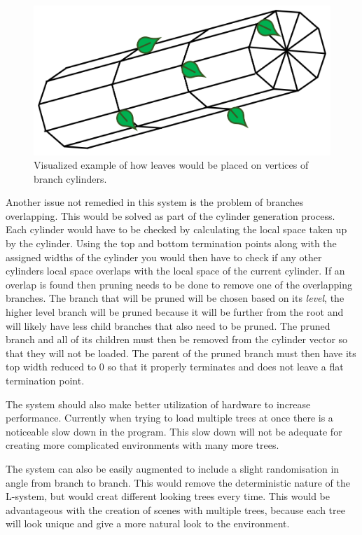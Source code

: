 \documentclass[final]{cmpreport}
\begin{document}
\begin{figure}[ht]
    \includegraphics[scale=0.4]{leaf-placement.PNG} 
    \centering
    \captionsetup{justification=centering}
    \caption{Visualized example of how leaves would be placed on vertices of branch cylinders.}
    \label{fig:leaf-placement}
\end{figure}

Another issue not remedied in this system is the problem of branches overlapping. This would be solved 
as part of the cylinder generation process. Each cylinder would have to be checked by calculating 
the local space taken up by the cylinder. Using the top and bottom termination points along with the 
assigned widths of the cylinder you would then have to check if any other cylinders local space 
overlaps with the local space of the current cylinder. If an overlap is found then pruning needs to 
be done to remove one of the overlapping branches. The branch that will be pruned will be chosen 
based on its \emph{level}, the higher level branch will be pruned because it will be further from 
the root and will likely have less child branches that also need to be pruned. The pruned branch 
and all of its children must then be removed from the cylinder vector so that they will not be 
loaded. The parent of the pruned branch must then have its top width reduced to 0 so that it 
properly terminates and does not leave a flat termination point.

The system should also make better utilization of hardware to increase performance. Currently when 
trying to load multiple trees at once there is a noticeable slow down in the program. This slow down 
will not be adequate for creating more complicated environments with many more trees.

The system can also be easily augmented to include a slight randomisation in angle from branch to branch.
This would remove the deterministic nature of the L-system, but would creat different looking trees 
every time. This would be advantageous with the creation of scenes with multiple trees, because each tree will 
look unique and give a more natural look to the environment.
\end{document}
